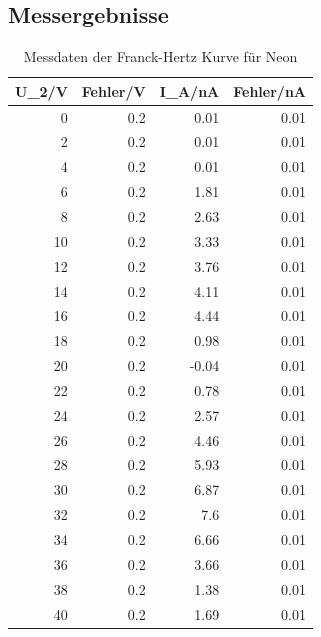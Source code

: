 \documentclass[12pt,a4paper]{article}
\begin{document}
\subsection{Messergebnisse}
\begin{table}[H]
\caption{Messdaten der Franck-Hertz Kurve für Neon}
\begin{center}
\begin{tabular}{|r|r|r|r|}
\hline
\multicolumn{1}{|l|}{U\_2/V} & \multicolumn{1}{l|}{Fehler/V} & \multicolumn{1}{l|}{I\_A/nA} & \multicolumn{1}{l|}{Fehler/nA} \\ \hline
0 & 0.2 & 0.01 & 0.01 \\ \hline
2 & 0.2 & 0.01 & 0.01 \\ \hline
4 & 0.2 & 0.01 & 0.01 \\ \hline
6 & 0.2 & 1.81 & 0.01 \\ \hline
8 & 0.2 & 2.63 & 0.01 \\ \hline
10 & 0.2 & 3.33 & 0.01 \\ \hline
12 & 0.2 & 3.76 & 0.01 \\ \hline
14 & 0.2 & 4.11 & 0.01 \\ \hline
16 & 0.2 & 4.44 & 0.01 \\ \hline
18 & 0.2 & 0.98 & 0.01 \\ \hline
20 & 0.2 & -0.04 & 0.01 \\ \hline
22 & 0.2 & 0.78 & 0.01 \\ \hline
24 & 0.2 & 2.57 & 0.01 \\ \hline
26 & 0.2 & 4.46 & 0.01 \\ \hline
28 & 0.2 & 5.93 & 0.01 \\ \hline
30 & 0.2 & 6.87 & 0.01 \\ \hline
32 & 0.2 & 7.6 & 0.01 \\ \hline
34 & 0.2 & 6.66 & 0.01 \\ \hline
36 & 0.2 & 3.66 & 0.01 \\ \hline
38 & 0.2 & 1.38 & 0.01 \\ \hline
40 & 0.2 & 1.69 & 0.01 \\ \hline

\end{tabular}
\end{center}
\end{table}
\end{document}
